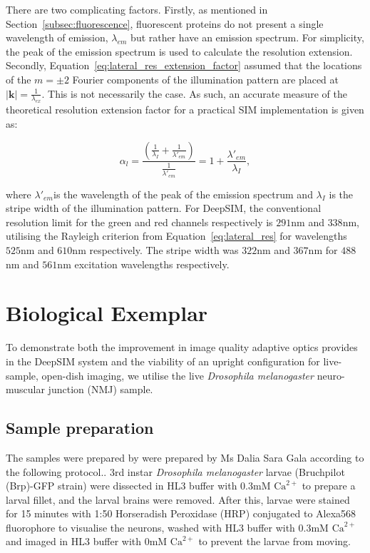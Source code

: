 There are two complicating factors. Firstly, as mentioned in 
Section~\ref{subsec:fluorescence}, fluorescent proteins do not present 
a single wavelength of emission, $\lambda_{em}$ but rather have an 
emission spectrum. For simplicity, the peak of the emission spectrum is
used to calculate the resolution extension. Secondly, 
Equation~\ref{eq:lateral_res_extension_factor} assumed that the locations
of the $m=\pm2$ Fourier components of the illumination pattern are placed
at $\left|\textbf{k}\right| = \frac{1}{\lambda_{ex}}$. This is not 
necessarily the case. As such, an accurate measure of the theoretical
resolution extension factor for a practical SIM implementation is given as:

\begin{equation}\label{eq:lateral_res_extension_factor_real}
\alpha_{l} = \frac{\left(\frac{1}{\lambda_{I}} + \frac{1}{\lambda'_{em}}\right)}{\frac{1}{\lambda'_{em}}} = 1 + \frac{\lambda'_{em}}{\lambda_{I}},
\end{equation}

where $\lambda'_{em}$is the wavelength of the peak of the emission 
spectrum and $\lambda_{I}$ is the stripe width of the illumination
pattern. For DeepSIM, the conventional resolution limit for the 
green and red channels respectively is $291$nm and $338$nm, 
utilising the Rayleigh criterion from Equation~\ref{eq:lateral_res} 
for wavelengths $525$nm and $610$nm respectively. The stripe width was $322$nm 
and $367$nm for $488$nm and $561$nm excitation wavelengths respectively.

\section{Biological Exemplar}
\label{sec:DeepSIM_biology}

To demonstrate both the improvement in image quality adaptive optics
provides in the DeepSIM system and the viability of an upright configuration 
for live-sample, open-dish imaging, we utilise the live \textit{Drosophila melanogaster} neuro-muscular junction (NMJ) sample.

\subsection{Sample preparation}
\label{subsec:DeepSIM_sample_prep}

The samples were prepared by were prepared by Ms Dalia Sara Gala according to 
the following protocol.\cite{brent2009drosophila}. 3rd instar 
\textit{Drosophila melanogaster} larvae (Bruchpilot (Brp)-GFP strain) 
were dissected in HL3 
buffer with 0.3mM $\text{Ca}^{2+}$ to prepare a larval fillet,
and the larval brains were removed. After this, larvae were stained for 15 
minutes with 1:50 Horseradish Peroxidase (HRP) conjugated to Alexa568 
fluorophore to visualise the neurons, washed with HL3 buffer with 0.3mM 
$\text{Ca}^{2+}$ and imaged in HL3 buffer with 0mM $\text{Ca}^{2+}$ to 
prevent the larvae from moving.

